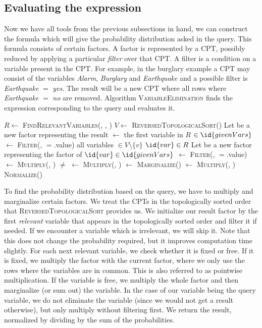 \documentclass[10pt,a4paper]{article}
\begin{document}
\subsection{Evaluating the expression}
Now we have all tools from the previous subsections in hand, we can construct the formula which will give the probability distribution asked in the query. This formula consists of certain factors. A factor is represented by a CPT, possibly reduced by applying a particular \emph{filter} over that CPT. A filter is a condition on a variable present in the CPT. For example, in the burglary example a CPT may consist of the variables \emph{Alarm}, \emph{Burglary} and \emph{Earthquake} and a possible filter is \emph{Earthquake} $=$ \emph{yes}. The result will be a new CPT where all rows where \emph{Earthquake} $=$ \emph{no} are removed. Algorithm \textsc{VariableElimination} finds the expression corresponding to the query and evaluates it.
\begin{codebox}
\li $R \gets $ \textsc{FindRelevantVariables}(, , )
\li $V \gets $ \textsc{ReversedTopologicalSort}()
\li Let  be a new factor representing the result
\li {} $\gets$ the first variable  in $R$
\zi
\li \If {} $\in \id{givenVars}$ \Then
\li	{} $\gets$ \textsc{Filter}(, $=$.value)
\End
\zi
\li \For all variables  $\in V \setminus \{v\}$ \Do 
\li	\If $\id{var} \in R$ \Then
\li	Let  be a new factor representing the factor of 
\li		\If $\id{var} \in \id{givenVars}$ \Then
\li			 {} $\gets$ \textsc{Filter}(, \id{var}$=$.value) 
\li			 {} $\gets$ \textsc{Multiply}(, )
		\End
\li	\Else \If {} $\neq$  \Then
\li		{} $\gets$ \textsc{Multiply}(, )
\li		{} $\gets$ \textsc{Marginalize}()
\li	\Else 
\li		{} $\gets$ \textsc{Multiply}(, )
	\End
	\End
\End
\zi
\li \Return \textsc{Normalize}()
\end{codebox}
To find the probability distribution based on the query, we have to multiply and marginalize certain factors. We treat the CPTs in the topologically sorted order that \textsc{ReversedTopologicalSort} provides us. We initialize our result factor by the first \emph{relevant} variable that appears in the topologically sorted order and filter it if needed. If we encounter a variable which is irrelevant, we will skip it. Note that this does not change the probability required, but it improves computation time slightly. For each next relevant variable, we check whether it is fixed or free. If it is fixed, we multiply the factor with the current factor, where we only use the rows where the variables are in common. This is also referred to as pointwise multiplication. If the variable is free, we multiply the whole factor and then marginalize (or sum out) the variable. In the case of our variable being the query variable, we do not eliminate the variable (since we would not get a result otherwise), but only multiply without filtering first. We return the result, normalized by dividing by the sum of the probabilities.
\end{document}

